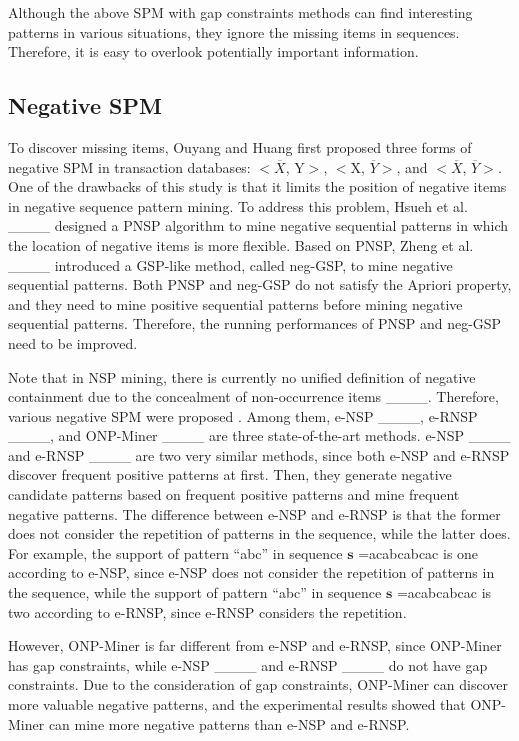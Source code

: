 Although the above SPM with gap constraints methods can find interesting patterns in various situations, they ignore the missing items in sequences. Therefore, it is easy to overlook potentially important information.

\subsection{Negative SPM}
{To discover missing items, Ouyang and Huang \cite {ouyang2007} first proposed three forms of negative SPM in transaction databases: $<$$\overline {X}$, Y$>$, $<$X, $\overline {Y}$$>$, and $<$$\overline {X}$, $\overline {Y}$$>$. One of the drawbacks of this study is that it limits the position of negative items in negative sequence pattern mining. To address this problem, Hsueh et al. ____ designed a PNSP algorithm to mine negative sequential patterns in which the location of negative items is more flexible. Based on PNSP, Zheng et al. ____ introduced a GSP-like method, called neg-GSP, to mine negative sequential patterns. Both PNSP and neg-GSP do not satisfy the Apriori property, and they need to mine positive sequential patterns before mining negative sequential patterns. Therefore, the running performances of PNSP and neg-GSP need to be improved.} 

Note that in NSP mining, there is currently no unified definition of negative containment due to the concealment of non-occurrence items ____. Therefore, various negative SPM were proposed \cite {hannegative, 18_Wang2021}. Among them,  e-NSP ____,  e-RNSP ____, and ONP-Miner ____ are three state-of-the-art methods. e-NSP ____ and e-RNSP  ____ are two very similar methods, since both e-NSP and e-RNSP discover frequent positive patterns at first. Then, they generate negative candidate patterns based on frequent positive patterns and mine frequent negative patterns. The difference between e-NSP and e-RNSP is that the former does not consider the repetition of patterns in the sequence, while the latter does.  For example, the support of pattern ``abc'' in sequence  $ \mathbf s $ =acabcabcac is one according to e-NSP, since e-NSP does not consider the repetition of patterns in the sequence, while the support of pattern ``abc''  in sequence  $ \mathbf s $ =acabcabcac is two according to e-RNSP, since e-RNSP considers the repetition. 

However, ONP-Miner is far different from e-NSP and e-RNSP, since ONP-Miner \cite {onpminer} has gap constraints, while e-NSP ____ and e-RNSP  ____ do not have gap constraints. Due to the consideration of gap constraints, ONP-Miner can discover more valuable negative patterns, and the experimental results showed that ONP-Miner can mine more negative patterns than e-NSP and e-RNSP.


